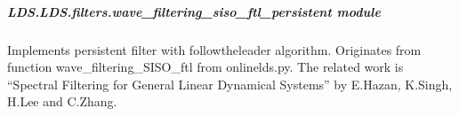 \documentclass[letterpaper,10pt,english]{sphinxmanual}
\begin{document}
\subparagraph{LDS.LDS.filters.wave\_filtering\_siso\_ftl\_persistent module}
\label{\detokenize{LDS.LDS.filters:module-LDS.LDS.filters.wave_filtering_siso_ftl_persistent}}\label{\detokenize{LDS.LDS.filters:lds-lds-filters-wave-filtering-siso-ftl-persistent-module}}
\sphinxAtStartPar
Implements persistent filter with follow\sphinxhyphen{}the\sphinxhyphen{}leader algorithm.
Originates from function wave\_filtering\_SISO\_ftl from onlinelds.py.
The related work is “Spectral Filtering for General Linear Dynamical Systems”
by E.Hazan, K.Singh, H.Lee and C.Zhang.
\end{document}
